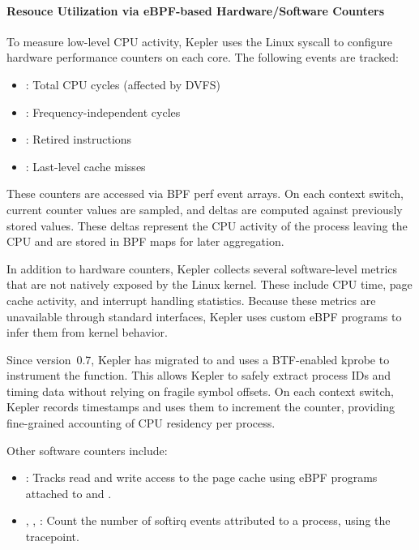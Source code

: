 \paragraph{Resouce Utilization via eBPF-based Hardware/Software Counters}

To measure low-level CPU activity, Kepler uses the Linux syscall  to configure hardware performance counters on each core. The following events are tracked:
\begin{itemize}
  \item {}: Total CPU cycles (affected by DVFS)
  \item {}: Frequency-independent cycles
  \item {}: Retired instructions
  \item {}: Last-level cache misses
\end{itemize}

These counters are accessed via BPF perf event arrays. On each context switch, current counter values are sampled, and deltas are computed against previously stored values. These deltas represent the CPU activity of the process leaving the CPU and are stored in BPF maps for later aggregation.

In addition to hardware counters, Kepler collects several software-level metrics that are not natively exposed by the Linux kernel. These include CPU time, page cache activity, and interrupt handling statistics. Because these metrics are unavailable through standard interfaces, Kepler uses custom eBPF programs to infer them from kernel behavior.

Since version~0.7, Kepler has migrated to  and uses a BTF-enabled kprobe to instrument the  function. This allows Kepler to safely extract process IDs and timing data without relying on fragile symbol offsets. On each context switch, Kepler records timestamps and uses them to increment the  counter, providing fine-grained accounting of CPU residency per process.

Other software counters include:
\begin{itemize}
  \item {}: Tracks read and write access to the page cache using eBPF programs attached to  and .
  \item {}, , : Count the number of softirq events attributed to a process, using the  tracepoint.
\end{itemize}


